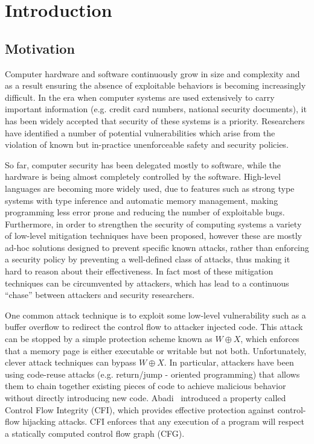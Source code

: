 \chapter{Introduction}\label{ch:introduction}

\section{Motivation}\label{sec:motivation}

Computer hardware and software continuously grow in size and complexity and as a
result ensuring the absence of exploitable behaviors is becoming increasingly 
difficult. In the era when computer systems are used extensively to
carry important information (e.g. credit card numbers, national security
documents), it has been widely accepted that security of these systems is a
priority. Researchers have identified a number of potential vulnerabilities
which arise from the violation of known but in-practice unenforceable safety
and security policies.
 
So far, computer security has been delegated mostly to software, while the 
hardware is being almost completely controlled by the software.
High-level languages are becoming more widely used,
due to features such as strong type systems with type inference
and automatic memory
management, making programming less error prone and reducing the number of
exploitable bugs. Furthermore, in order to strengthen the security of computing
systems a variety of low-level
mitigation techniques 
have been
proposed, however these are mostly ad-hoc solutions designed to prevent specific
known attacks, rather than enforcing a security policy 
by preventing a well-defined class of attacks,
thus making it hard to reason about their
effectiveness. In fact most of these mitigation techniques can be circumvented
by attackers, 
which has lead to a continuous ``chase''
between attackers and security researchers.

One common attack technique is to 
exploit some low-level vulnerability such as a
buffer overflow to redirect the control flow to 
attacker injected code. This attack
can be stopped by a simple protection scheme known as $W \oplus X$, which
enforces that a memory page is either executable or writable but not both.
Unfortunately, clever attack techniques can bypass $W \oplus X$. In
particular, attackers have been using code-reuse attacks
(e.g. return/jump - oriented programming) that allows them to chain together
existing pieces of code to achieve malicious behavior without directly
introducing new code.
Abadi~\ETAL\cite{abadi2005}
introduced a property called Control Flow Integrity (CFI),
which provides effective protection against control-flow hijacking attacks.
CFI enforces that any execution of a program will
respect a statically computed control flow graph (CFG).


